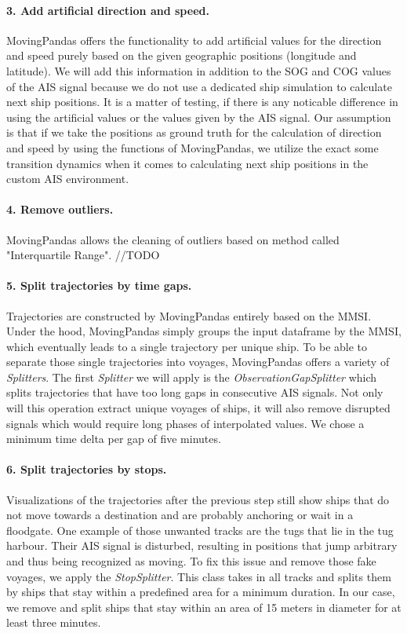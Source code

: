 \paragraph{3. Add artificial direction and speed.}
MovingPandas offers the functionality to add artificial values for the direction and speed purely based on the given geographic positions (longitude and latitude). We will add this information in addition to the SOG and COG values of the AIS signal because we do not use a dedicated ship simulation to calculate next ship positions. It is a matter of testing, if there is any noticable difference in using the artificial values or the values given by the AIS signal. Our assumption is that if we take the positions as ground truth for the calculation of direction and speed by using the functions of MovingPandas, we utilize the exact some transition dynamics when it comes to calculating next ship positions in the custom AIS environment.

\paragraph{4. Remove outliers.}
MovingPandas allows the cleaning of outliers based on method called "Interquartile Range". 
//TODO

\paragraph{5. Split trajectories by time gaps.}
Trajectories are constructed by MovingPandas entirely based on the MMSI. Under the hood, MovingPandas simply groups the input dataframe by the MMSI, which eventually leads to a single trajectory per unique ship. To be able to separate those single trajectories into voyages, MovingPandas offers a variety of \textit{Splitters}. The first \textit{Splitter} we will apply is the \textit{ObservationGapSplitter} which splits trajectories that have too long gaps in consecutive AIS signals. Not only will this operation extract unique voyages of ships, it will also remove disrupted signals which would require long phases of interpolated values.
We chose a minimum time delta per gap of five minutes.

\paragraph{6. Split trajectories by stops.}
Visualizations of the trajectories after the previous step still show ships that do not move towards a destination and are probably anchoring or wait in a floodgate. One example of those unwanted tracks are the tugs that lie in the tug harbour. Their AIS signal is disturbed, resulting in positions that jump arbitrary and thus being recognized as moving. To fix this issue and remove those fake voyages, we apply the \textit{StopSplitter}. This class takes in all tracks and splits them by ships that stay within a predefined area for a minimum duration. In our case, we remove and split ships that stay within an area of 15 meters in diameter for at least three minutes.


